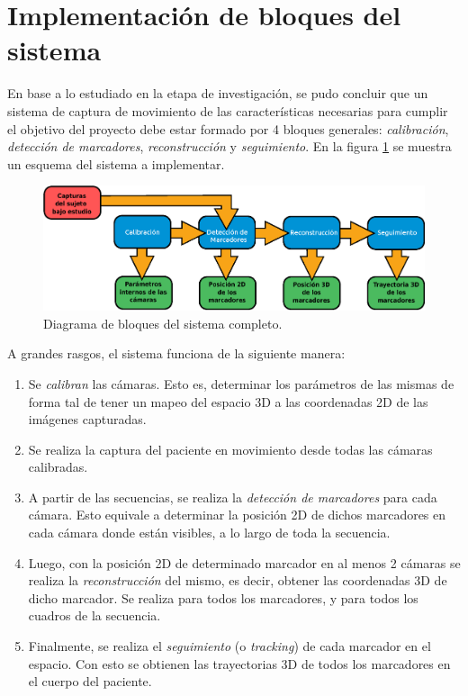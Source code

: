 \section{Implementación de bloques del sistema}
\label{sec:implementacion_bloques_sistema}


En base a lo estudiado en la etapa de investigación, se pudo concluir que un sistema de captura de movimiento de las características necesarias para cumplir el objetivo del proyecto debe estar formado por 4 bloques generales: \emph{calibración}, \emph{detección de marcadores}, \emph{reconstrucción} y \emph{seguimiento}. En la figura \ref{bloquesSist} se muestra un esquema del sistema a implementar.

\begin{figure}[H]
\begin{center}
\includegraphics[scale=0.8]{img/Sistema_completo/Diagrama_de_bloques.eps}
\end{center}
\caption{Diagrama de bloques del sistema completo.}
\label{bloquesSist}
\end{figure}

A grandes rasgos, el sistema funciona de la siguiente manera:

\begin{enumerate}
	\item Se \emph{calibran} las cámaras. Esto es, determinar los parámetros de las mismas de forma tal de tener un mapeo del espacio 3D a las coordenadas 2D de las imágenes capturadas.
	\item Se realiza la captura del paciente en movimiento desde todas las cámaras calibradas.
	\item A partir de las secuencias, se realiza la \emph{detección de marcadores} para cada cámara. Esto equivale a determinar la posición 2D de dichos marcadores en cada cámara donde están visibles, a lo largo de toda la secuencia.
	\item Luego, con la posición 2D de determinado marcador en al menos 2 cámaras se realiza la \emph{reconstrucción} del mismo, es decir, obtener las coordenadas 3D de dicho marcador. Se realiza para todos los marcadores, y para todos los cuadros de la secuencia.
	\item Finalmente, se realiza el \emph{seguimiento} (o \emph{tracking}) de cada marcador en el espacio. Con esto se obtienen las trayectorias 3D de todos los marcadores en el cuerpo del paciente.
\end{enumerate}

